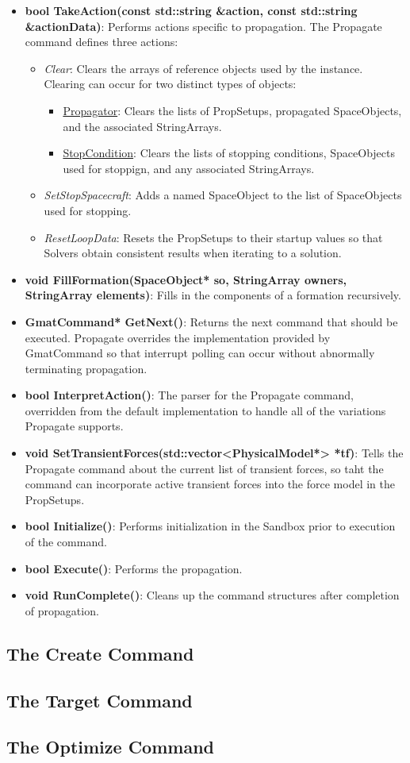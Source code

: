 \begin{itemize}
\item \textbf{bool TakeAction(const std::string \&action, const std::string \&actionData)}:
Performs actions specific to propagation.  The Propagate command defines three actions:
\begin{itemize}
\item \textit{Clear}: Clears the arrays of reference objects used by the instance.  Clearing can
occur for two distinct types of objects:
\begin{itemize}
\item \underline{Propagator}: Clears the lists of PropSetups, propagated SpaceObjects, and the
associated StringArrays.
\item \underline{StopCondition}:  Clears the lists of stopping conditions, SpaceObjects used for
stoppign, and any associated StringArrays.
\end{itemize}
\item \textit{SetStopSpacecraft}: Adds a named SpaceObject to the list of SpaceObjects used for
stopping.
\item \textit{ResetLoopData}: Resets the PropSetups to their startup values so that Solvers obtain
consistent results when iterating to a solution.
\end{itemize}
\item \textbf{void FillFormation(SpaceObject* so, StringArray owners, StringArray elements)}:  Fills
in the components of a formation recursively.
\item \textbf{GmatCommand* GetNext()}: Returns the next command that should be executed.  Propagate
overrides the implementation provided by GmatCommand so that interrupt polling can occur without
abnormally terminating propagation.
\item \textbf{bool InterpretAction()}:  The parser for the Propagate command, overridden from the
default implementation to handle all of the variations Propagate supports.
\item \textbf{void SetTransientForces(std::vector<PhysicalModel*> *tf)}:  Tells the Propagate
command about the current list of transient forces, so taht the command can incorporate active
transient forces into the force model in the PropSetups.
\item \textbf{bool Initialize()}:  Performs initialization in the Sandbox prior to execution of the
command.
\item \textbf{bool Execute()}:  Performs the propagation.
\item \textbf{void RunComplete()}:  Cleans up the command structures after completion of
propagation.
\end{itemize}


\subsection{The Create Command}

\subsection{The Target Command}

\subsection{The Optimize Command}

